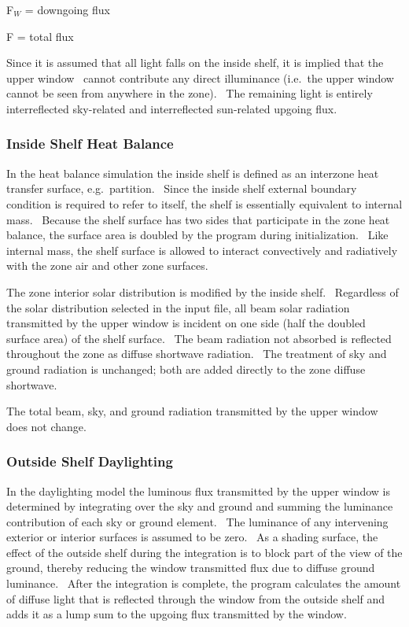 F\(_{W}\) = downgoing flux

F = total flux

Since it is assumed that all light falls on the inside shelf, it is implied that the upper window~ cannot contribute any direct illuminance (i.e.~the upper window cannot be seen from anywhere in the zone).~ The remaining light is entirely interreflected sky-related and interreflected sun-related upgoing flux.

\subsubsection{Inside Shelf Heat Balance}\label{inside-shelf-heat-balance}

In the heat balance simulation the inside shelf is defined as an interzone heat transfer surface, e.g.~partition.~ Since the inside shelf external boundary condition is required to refer to itself, the shelf is essentially equivalent to internal mass.~ Because the shelf surface has two sides that participate in the zone heat balance, the surface area is doubled by the program during initialization.~ Like internal mass, the shelf surface is allowed to interact convectively and radiatively with the zone air and other zone surfaces.

The zone interior solar distribution is modified by the inside shelf.~ Regardless of the solar distribution selected in the input file, all beam solar radiation transmitted by the upper window is incident on one side (half the doubled surface area) of the shelf surface.~ The beam radiation not absorbed is reflected throughout the zone as diffuse shortwave radiation.~ The treatment of sky and ground radiation is unchanged; both are added directly to the zone diffuse shortwave.

The total beam, sky, and ground radiation transmitted by the upper window does not change.

\subsubsection{Outside Shelf Daylighting}\label{outside-shelf-daylighting}

In the daylighting model the luminous flux transmitted by the upper window is determined by integrating over the sky and ground and summing the luminance contribution of each sky or ground element.~ The luminance of any intervening exterior or interior surfaces is assumed to be zero.~ As a shading surface, the effect of the outside shelf during the integration is to block part of the view of the ground, thereby reducing the window transmitted flux due to diffuse ground luminance.~ After the integration is complete, the program calculates the amount of diffuse light that is reflected through the window from the outside shelf and adds it as a lump sum to the upgoing flux transmitted by the window.

